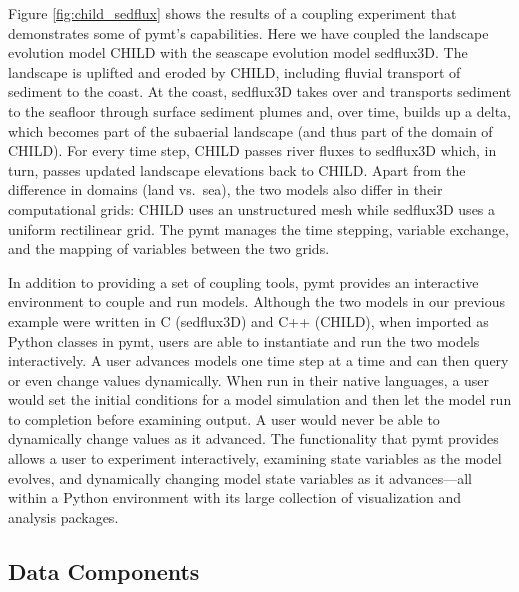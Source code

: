 \documentclass{article} %
\begin{document}
Figure \ref{fig:child_sedflux} shows the results of a coupling experiment
that demonstrates some of pymt's capabilities.
Here we have coupled the landscape evolution model CHILD with
the seascape evolution model sedflux3D. The landscape
is uplifted and eroded by CHILD, including fluvial transport of sediment to the coast. At the coast, sedflux3D takes over and transports sediment to the seafloor through surface sediment plumes and, over time, builds up a delta, which becomes part of
the subaerial landscape (and thus part of the domain of CHILD). For every time step, CHILD passes river fluxes
to sedflux3D which, in turn, passes updated landscape elevations back to CHILD.
Apart from the difference in domains (land vs.\ sea), the two models also differ in their computational grids: CHILD uses an unstructured mesh while sedflux3D uses a uniform rectilinear grid. The pymt manages the time stepping, variable exchange, and the mapping of variables between the two grids.

In addition to providing a set of coupling tools, pymt provides
an interactive environment to couple and run models. Although the two models in
our previous example were written in C (sedflux3D) and C++ (CHILD), when imported as Python classes in pymt, users are able to instantiate and 
run the two models interactively. A user advances models one time step at a time and can then
query or even change values dynamically. When run in their native languages, a user
would set the initial conditions for a model simulation and then let the model run
to completion before examining output. A user would never be able to dynamically change values as it advanced. The  functionality that pymt provides 
allows a user to experiment interactively, examining state variables
as the model evolves, and 
dynamically changing model state variables as it advances---all within a Python
environment with its large  collection of visualization and analysis packages.


\subsection{Data Components}
\end{document}

